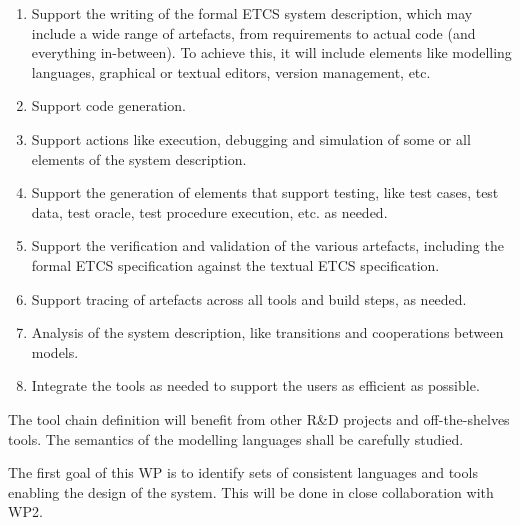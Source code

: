 \documentclass{template/openetcs_article}
\begin{document}
\begin{enumerate}
\item Support the writing of the formal ETCS system
  description, which may include a wide range of artefacts, from requirements to actual code (and everything in-between).  To achieve this, it will include elements like modelling languages, graphical or textual editors, version management, etc.

\item Support code generation.

\item Support actions like execution, debugging and simulation of some or all elements of the system description.

\item Support the generation of elements that support testing, like test cases, test data, test oracle, test procedure execution, etc. as needed.

\item Support the verification and validation of the various artefacts, including the formal ETCS specification against the textual ETCS specification.


\item Support tracing of artefacts across all tools and build steps, as needed.

\item Analysis of the system description, like transitions and cooperations between models.

\item Integrate the tools as needed to support the users as efficient as possible.
 
\end{enumerate}

The tool chain definition will benefit from other R\&D projects and off-the-shelves tools. The semantics of the modelling languages shall be carefully studied.

The first goal of this WP is to identify sets of consistent languages and tools enabling the design of the system.  This will be done in close collaboration with WP2.
\end{document}
